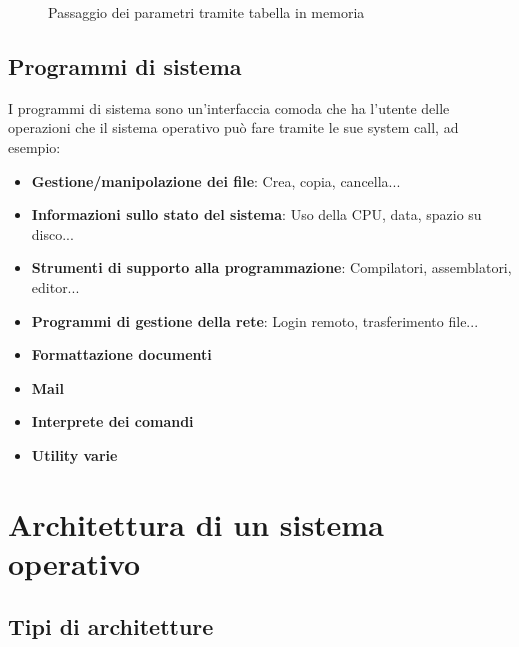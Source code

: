 \documentclass[a4paper]{article}
\begin{document}
\begin{enumerate}
\begin{figure}[H]
      \caption{Passaggio dei parametri tramite tabella in memoria}
    \end{figure}
\end{enumerate}

\subsection{Programmi di sistema}
I programmi di sistema sono un'interfaccia comoda che ha l'utente delle operazioni che il
sistema operativo può fare tramite le sue system call, ad esempio:
\begin{itemize}
  \item \textbf{Gestione/manipolazione dei file}: Crea, copia, cancella...
  \item \textbf{Informazioni sullo stato del sistema}: Uso della CPU, data, spazio su 
    disco...
  \item \textbf{Strumenti di supporto alla programmazione}: Compilatori, assemblatori,
    editor...
  \item \textbf{Programmi di gestione della rete}: Login remoto, trasferimento file...
  \item \textbf{Formattazione documenti}
  \item \textbf{Mail}
  \item \textbf{Interprete dei comandi}
  \item \textbf{Utility varie}
\end{itemize}

\section{Architettura di un sistema operativo}
\subsection{Tipi di architetture}
\end{document}
